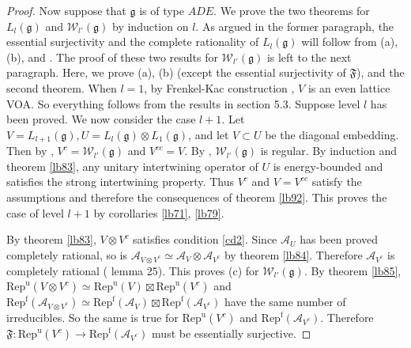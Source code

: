 \documentclass[12pt,a4paper]{article}
\theoremstyle{definition}
\theoremstyle{plain}
\newcommand{\fk}{\mathfrak}
\newcommand{\mc}{\mathcal}
\newcommand{\Repu}{\mathrm{Rep}^{\mathrm u}}
\newcommand{\gk}{\mathfrak g}
\newcommand{\Repf}{\mathrm{Rep}^{\mathrm f}}
\numberwithin{equation}{subsection}
\begin{document}
\begin{proof}
Now suppose that $\gk$ is of type $ADE$. We prove the two theorems for $L_l(\gk)$ and $\mc W_{l'}(\gk)$ by induction on $l$. As argued in the former paragraph, the essential surjectivity and the complete rationality of $L_l(\gk)$ will follow from (a), (b), and \cite{LX04,Hen19,MTW18}. The proof of these two results for $\mc W_{l'}(\gk)$ is left to the next paragraph. Here, we prove (a), (b) (except the essential surjectivity of $\fk F$), and the second theorem. When $l=1$, by  Frenkel-Kac construction \cite{FK80}, $V$ is an even lattice VOA. So everything follows from the results in \cite{Gui21a} section 5.3.  Suppose level $l$ has been proved. We now consider the case $l+1$. Let $V=L_{l+1}(\gk),U=L_l(\gk)\otimes L_1(\gk)$, and let $V\subset U$ be the diagonal embedding. Then by \cite{ACL19}, $V^c=\mc W_{l'}(\gk)$ and $V^{cc}=V$. By \cite{Ara15a,Ara15b}, $\mc W_{l'}(\gk)$ is regular. By induction and theorem \ref{lb83}, any  unitary intertwining operator of $U$ is energy-bounded and satisfies the strong intertwining property. Thus  $V^c$ and  $V=V^{cc}$ satisfy the assumptions and therefore the consequences of theorem \ref{lb92}. This proves the case of level $l+1$ by corollaries \ref{lb71},  \ref{lb79}.

By theorem \ref{lb83}, $V\otimes V^c$ satisfies condition \ref{cd2}. Since $\mc A_U$ has been proved completely rational, so is $\mc A_{V\otimes V^c}\simeq\mc A_V\otimes \mc A_{V^c}$ by theorem \ref{lb84}. Therefore $\mc A_{V^c}$ is completely rational (\cite{Lon03} lemma 25). This proves (c) for $\mc W_{l'}(\gk)$. By theorem \ref{lb85}, $\Repu(V\otimes V^c)\simeq \Repu(V)\boxtimes\Repu(V^c)$ and  $\Repf(\mc A_{V\otimes V^c})\simeq\Repf(\mc A_V)\boxtimes \Repf(\mc A_{V^c})$ have the same number of irreducibles. So the same is true for $\Repu(V^c)$ and $\Repf(\mc A_{V^c})$. Therefore $\fk F:\Repu(V^c)\rightarrow\Repf(\mc A_{V^c})$ must be essentially surjective.
\end{proof}
\end{document}
